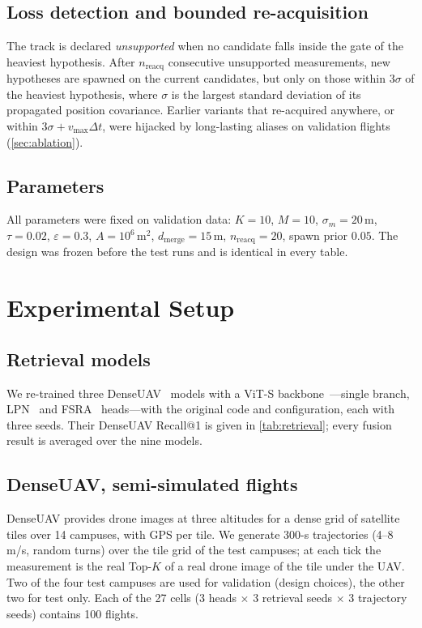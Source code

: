 \documentclass[journal]{IEEEtran}
\begin{document}
\subsection{Loss detection and bounded re-acquisition}
The track is declared \emph{unsupported} when no candidate falls inside the gate of the heaviest hypothesis. After
$n_{\mathrm{reacq}}$ consecutive unsupported measurements, new hypotheses are spawned on the current candidates, but
only on those within $3\sigma$ of the heaviest hypothesis, where $\sigma$ is the largest standard deviation of its
propagated position covariance. Earlier variants that re-acquired anywhere, or within $3\sigma+v_{\max}\Delta t$, were
hijacked by long-lasting aliases on validation flights (\cref{sec:ablation}).

\subsection{Parameters}
All parameters were fixed on validation data: $K=10$, $M=10$, $\sigma_m=20$\,m, $\tau=0.02$, $\varepsilon=0.3$,
$A=10^6$\,m$^2$, $d_{\mathrm{merge}}=15$\,m, $n_{\mathrm{reacq}}=20$, spawn prior $0.05$. The design was frozen before the
test runs and is identical in every table.

\section{Experimental Setup}\label{sec:setup}
\subsection{Retrieval models}
We re-trained three DenseUAV~\cite{dai2024denseuav} models with a ViT-S backbone~\cite{dosovitskiy2021vit}---single
branch, LPN~\cite{wang2022lpn} and FSRA~\cite{dai2022fsra} heads---with the original code and configuration, each with
three seeds. Their DenseUAV Recall@1 is given in \cref{tab:retrieval}; every fusion result is averaged over the nine
models.

\subsection{DenseUAV, semi-simulated flights}
DenseUAV provides drone images at three altitudes for a dense grid of satellite tiles over 14 campuses, with GPS per
tile. We generate 300-s trajectories (4--8\,m/s, random turns) over the tile grid of the test campuses; at each tick the
measurement is the real Top-$K$ of a real drone image of the tile under the UAV. Two of the four test campuses are used
for validation (design choices), the other two for test only. Each of the 27 cells (3 heads $\times$ 3 retrieval seeds
$\times$ 3 trajectory seeds) contains 100 flights.
\end{document}

